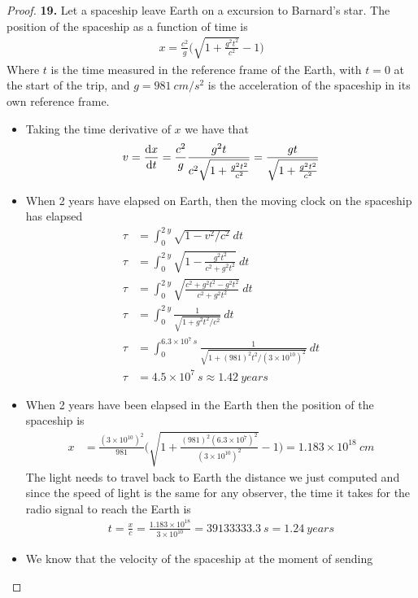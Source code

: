\documentclass[11pt]{article}
\newcommand{\sci}[1]{\times 10^{#1}}
\theoremstyle{definition}
\begin{document}
\cleardoublepage
\begin{proof}{\textbf{19.}}
Let a spaceship leave Earth on a excursion to Barnard's star. The position of
the spaceship as a function of time is
\begin{align*}
    x = \frac{c^2}{g}\bigg(\sqrt{1 + \frac{g^2t^2}{c^2}} - 1\bigg)
\end{align*}
Where $t$ is the time measured in the reference frame of the Earth, with
$t =0$ at the start of the trip, and $g = 981~cm/s^2$ is the acceleration of
the spaceship in its own reference frame.
\begin{itemize}
\item [(a)] Taking the time derivative of $x$ we have that
\begin{align*}
    v = \dv{x}{t} = \frac{c^2}{g}\frac{g^2 t}{c^2\sqrt{1 + \frac{g^2t^2}{c^2}}}
    = \frac{g t}{\sqrt{1 + \frac{g^2t^2}{c^2}}}
\end{align*}
\item [(b)] When 2 years have elapsed on Earth, then the moving clock on the
spaceship has elapsed
\begin{align*}
    \tau &= \int_0^{2~y} \sqrt{1 - v^2/c^2} ~dt\\
    \tau &= \int_0^{2~y} \sqrt{1 - \frac{g^2 t^2}{c^2 + g^2t^2}} ~dt\\
    \tau &= \int_0^{2~y} \sqrt{\frac{c^2 + g^2t^2 - g^2 t^2}{c^2 + g^2t^2}} ~dt\\
    \tau &= \int_0^{2~y} \frac{1}{\sqrt{1 + g^2t^2/c^2}} ~dt\\
    \tau &= \int_0^{6.3\sci{7}~s}\frac{1}{\sqrt{1 + (981)^2t^2/(3\sci{10})^2}} ~dt\\
    \tau &= 4.5\sci{7}~s \approx 1.42~years
\end{align*}
\item [(c)] When 2 years have been elapsed in the Earth then the position of
the spaceship is
\begin{align*}
    x &= \frac{(3\sci{10})^2}{981}
    \bigg(\sqrt{1 + \frac{(981)^2(6.3\sci{7})^2}{(3\sci{10})^2}} - 1\bigg)
    = 1.183\sci{18}~cm
\end{align*}
The light needs to travel back to Earth the distance we just computed and since
the speed of light is the same for any observer, the time it takes for the radio
signal to reach the Earth is
\begin{align*}
    t = \frac{x}{c} = \frac{1.183\sci{18}}{3\sci{10}} = 39133333.3~s 
    = 1.24~years
\end{align*}
\item [(d)] We know that the velocity of the spaceship at the moment of sending

\end{itemize}
\end{proof}
\end{document}
